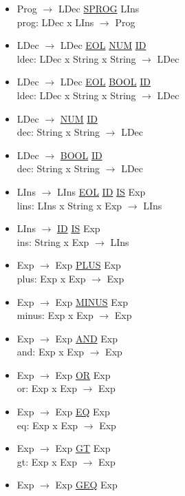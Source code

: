 \documentclass[\main/MemoriaPL.tex]{subfiles}
\begin{document}
    \begin{itemize}
      \item Prog $\rightarrow$ LDec \underline{SPROG} LIns\\
        prog: LDec x LIns $\rightarrow$ Prog
      \item LDec $\rightarrow$ LDec \underline{EOL} \underline{NUM}
        \underline{ID}\\
        ldec: LDec x String x String $\rightarrow$ LDec
      \item LDec $\rightarrow$ LDec \underline{EOL} \underline{BOOL}
        \underline{ID}\\
        ldec: LDec x String x String $\rightarrow$ LDec
      \item LDec $\rightarrow$ \underline{NUM} \underline{ID}\\
        dec: String x String $\rightarrow$ LDec
      \item LDec $\rightarrow$ \underline{BOOL} \underline{ID}\\
        dec: String x String $\rightarrow$ LDec
      \item LIns $\rightarrow$ LIns \underline{EOL} \underline{ID}
        \underline{IS} Exp\\
        lins: LIns x String x Exp $\rightarrow$ LIns
      \item LIns $\rightarrow$ \underline{ID} \underline{IS} Exp\\
        ins: String x Exp $\rightarrow$ LIns
      \item Exp $\rightarrow$ Exp \underline{PLUS} Exp\\
        plus: Exp x Exp $\rightarrow$ Exp
      \item Exp $\rightarrow$ Exp \underline{MINUS} Exp\\
        minus: Exp x Exp $\rightarrow$ Exp
      \item Exp $\rightarrow$ Exp \underline{AND} Exp\\
        and: Exp x Exp $\rightarrow$ Exp
      \item Exp $\rightarrow$ Exp \underline{OR} Exp\\
        or: Exp x Exp $\rightarrow$ Exp
      \item Exp $\rightarrow$ Exp \underline{EQ} Exp\\
        eq: Exp x Exp $\rightarrow$ Exp
      \item Exp $\rightarrow$ Exp \underline{GT} Exp\\
        gt: Exp x Exp $\rightarrow$ Exp
      \item Exp $\rightarrow$ Exp \underline{GEQ} Exp\\

\end{itemize}
\end{document}
